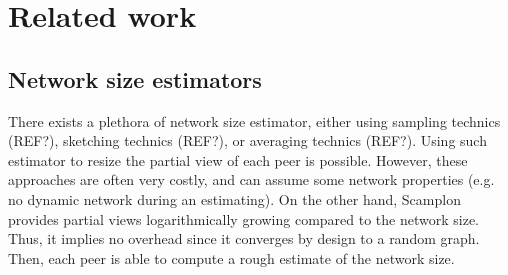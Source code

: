 
\section{Related work}
\label{sec:relatedwork}

\subsection{Network size estimators}
There exists a plethora of network size estimator, either using sampling
technics (REF?), sketching technics (REF?), or averaging technics (REF?). Using
such estimator to resize the partial view of each peer is possible. However,
these approaches are often very costly, and can assume some network properties
(e.g. no dynamic network during an estimating). On the other hand, Scamplon
provides partial views logarithmically growing compared to the network
size. Thus, it implies no overhead since it converges by design to a random
graph. Then, each peer is able to compute a rough estimate of the network size.


